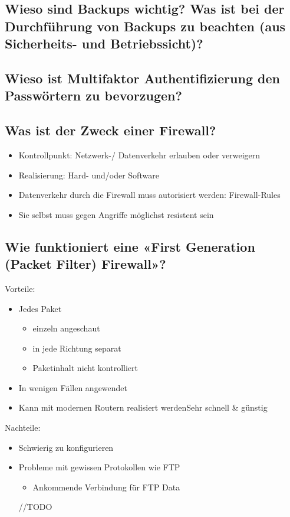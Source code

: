 \subsection*{Wieso sind Backups wichtig? Was ist bei der Durchführung von Backups zu beachten (aus Sicherheits- und Betriebssicht)?}
\subsection*{Wieso ist Multifaktor Authentifizierung den Passwörtern zu bevorzugen?}
\subsection*{Was ist der Zweck einer Firewall?}
\begin{itemize}
    \item Kontrollpunkt: Netzwerk-/ Datenverkehr erlauben oder verweigern
    \item Realisierung: Hard- und/oder Software
    \item Datenverkehr durch die Firewall muss autorisiert werden: Firewall-Rules
    \item Sie selbst muss gegen Angriffe möglichst resistent sein
\end{itemize}

\subsection*{Wie funktioniert eine «First Generation (Packet Filter) Firewall»?}
Vorteile:
\begin{itemize}
    \item Jedes Paket
    \begin{itemize}
        \item einzeln angeschaut
        \item in jede Richtung separat
        \item Paketinhalt nicht kontrolliert
    \end{itemize}
    \item In wenigen Fällen angewendet
    \item Kann mit modernen Routern realisiert werdenSehr schnell \& günstig
\end{itemize}
Nachteile:
\begin{itemize}
    \item Schwierig zu konfigurieren
    \item Probleme mit gewissen Protokollen wie FTP
    \begin{itemize}
        \item Ankommende Verbindung für FTP Data
    \end{itemize}
    //TODO
\end{itemize}

